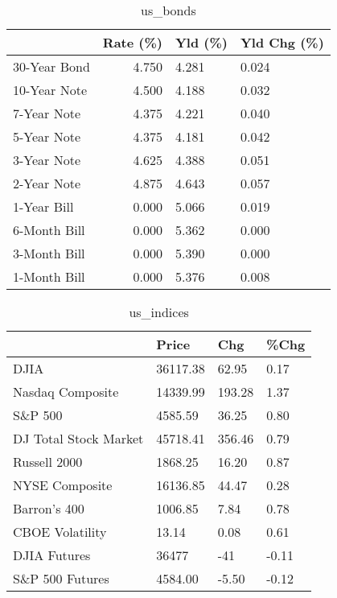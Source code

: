 \documentclass{article}%
\begin{document}
%


\begin{table}[htbp]%
\caption{us\_bonds}%
\centering%
\begin{adjustbox}{width=1\textwidth}%
\begin{tabular}{lrll}
\toprule
             &  Rate (\%) & Yld (\%) & Yld Chg (\%) \\
\midrule
30-Year Bond &     4.750 &   4.281 &       0.024 \\
10-Year Note &     4.500 &   4.188 &       0.032 \\
 7-Year Note &     4.375 &   4.221 &       0.040 \\
 5-Year Note &     4.375 &   4.181 &       0.042 \\
 3-Year Note &     4.625 &   4.388 &       0.051 \\
 2-Year Note &     4.875 &   4.643 &       0.057 \\
 1-Year Bill &     0.000 &   5.066 &       0.019 \\
6-Month Bill &     0.000 &   5.362 &       0.000 \\
3-Month Bill &     0.000 &   5.390 &       0.000 \\
1-Month Bill &     0.000 &   5.376 &       0.008 \\
\bottomrule
\end{tabular}
%
\end{adjustbox}%
\end{table}

%


\begin{table}[htbp]%
\caption{us\_indices}%
\centering%
\begin{adjustbox}{width=1\textwidth}%
\begin{tabular}{llll}
\toprule
                      &    Price &    Chg &  \%Chg \\
\midrule
                 DJIA & 36117.38 &  62.95 &  0.17 \\
     Nasdaq Composite & 14339.99 & 193.28 &  1.37 \\
              S\&P 500 &  4585.59 &  36.25 &  0.80 \\
DJ Total Stock Market & 45718.41 & 356.46 &  0.79 \\
         Russell 2000 &  1868.25 &  16.20 &  0.87 \\
       NYSE Composite & 16136.85 &  44.47 &  0.28 \\
         Barron's 400 &  1006.85 &   7.84 &  0.78 \\
      CBOE Volatility &    13.14 &   0.08 &  0.61 \\
         DJIA Futures &    36477 &    -41 & -0.11 \\
      S\&P 500 Futures &  4584.00 &  -5.50 & -0.12 \\
\bottomrule
\end{tabular}
%
\end{adjustbox}%
\end{table}
\end{document}

